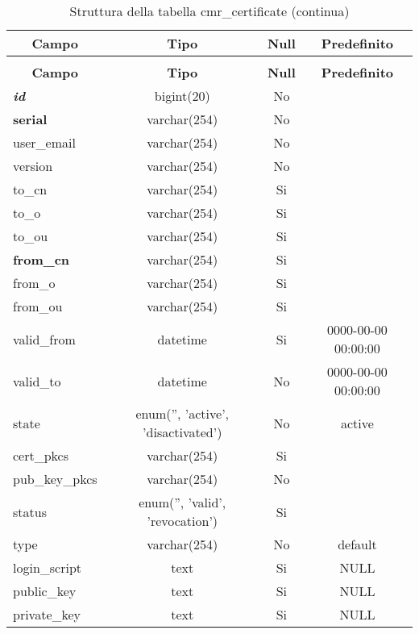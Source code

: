 %
%
 \begin{longtable}{|l|c|c|c|} 
 \caption{Struttura della tabella cmr\_certificate} \label{tab:cmr_certificate-structure} \\
 \hline \multicolumn{1}{|c|}{\textbf{Campo}} & \multicolumn{1}{|c|}{\textbf{Tipo}} & \multicolumn{1}{|c|}{\textbf{Null}} & \multicolumn{1}{|c|}{\textbf{Predefinito}} \\ \hline \hline
\endfirsthead
 \caption{Struttura della tabella cmr\_certificate (continua)} \\ 
 \hline \multicolumn{1}{|c|}{\textbf{Campo}} & \multicolumn{1}{|c|}{\textbf{Tipo}} & \multicolumn{1}{|c|}{\textbf{Null}} & \multicolumn{1}{|c|}{\textbf{Predefinito}} \\ \hline \hline \endhead \endfoot \textbf{\textit{id}} & bigint(20)  &  No  &  \\ \hline 
\textbf{serial} & varchar(254) &  No  &  \\ \hline 
user\_email & varchar(254) &  No  &  \\ \hline 
version & varchar(254) &  No  &  \\ \hline 
to\_cn & varchar(254) &  Si  &  \\ \hline 
to\_o & varchar(254) &  Si  &  \\ \hline 
to\_ou & varchar(254) &  Si  &  \\ \hline 
\textbf{from\_cn} & varchar(254) &  Si  &  \\ \hline 
from\_o & varchar(254) &  Si  &  \\ \hline 
from\_ou & varchar(254) &  Si  &  \\ \hline 
valid\_from & datetime &  Si  & 0000-00-00 00:00:00 \\ \hline 
valid\_to & datetime &  No  & 0000-00-00 00:00:00 \\ \hline 
state & enum('', 'active', 'disactivated') &  No  & active \\ \hline 
cert\_pkcs & varchar(254) &  Si  &  \\ \hline 
pub\_key\_pkcs & varchar(254) &  No  &  \\ \hline 
status & enum('', 'valid', 'revocation') &  Si  &  \\ \hline 
type & varchar(254) &  No  & default \\ \hline 
login\_script & text &  Si  & NULL \\ \hline 
public\_key & text &  Si  & NULL \\ \hline 
private\_key & text &  Si  & NULL \\ \hline 

\end{longtable}
